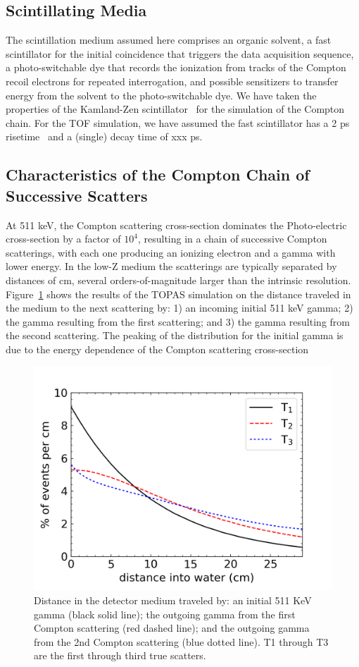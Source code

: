 \documentclass[12pt]{article}
\begin{document}
\subsection{Scintillating Media}
\label{Scintillating_media}
The scintillation medium assumed here comprises an organic solvent, a fast scintillator for the initial coincidence that triggers the data acquisition sequence, a photo-switchable dye that records the ionization from tracks of the Compton recoil electrons for repeated interrogation, and possible sensitizers to transfer energy from the solvent to the photo-switchable dye. We have taken the properties of the Kamland-Zen scintillator~\cite{Kamland_Zen} for the simulation of the Compton chain.
For the TOF simulation, we have assumed the fast scintillator has a 2 ps risetime~\cite{Buck_private_comm} and a (single) decay time of xxx ps.

\subsection{Characteristics of the Compton Chain of Successive Scatters}
\label{Compton_chain}
At 511 keV, the Compton scattering cross-section dominates the
Photo-electric cross-section by a factor of $10^{4}$, resulting in a
chain of successive Compton scatterings, with each one producing an
ionizing electron and a gamma with lower energy. In the low-Z medium the
scatterings are typically separated by distances of cm, several orders-of-magnitude
larger than the intrinsic resolution. Figure~\ref{fig:distance_traveled} shows
the results of the TOPAS simulation on the distance traveled in the medium
to the next scattering by: 1) an incoming initial 511 keV gamma; 2) the gamma resulting from the first scattering;
and 3) the gamma resulting from the second scattering. The peaking of the distribution for the initial  gamma is
due to the energy dependence of the Compton scattering cross-section


\begin{figure}[!ht]
\centering
  \includegraphics[width=0.45\linewidth]{Figures/scatter_dist_v1.png}
\caption{Distance in the detector medium traveled by: an initial 511 KeV gamma (black solid line);
the outgoing gamma from the first Compton scattering (red dashed line); and  the outgoing gamma from the 2nd Compton scattering (blue dotted line). T1 through T3 are the first through third true scatters.}
\label{fig:distance_traveled}
\end{figure}
\end{document}
